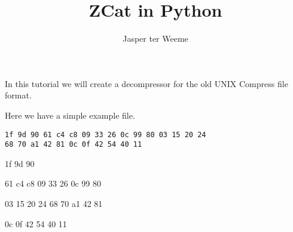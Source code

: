 \documentclass{article}
\title{ZCat in Python}
\author{Jasper ter Weeme}
\begin{document}
\maketitle
In this tutorial we will create a decompressor for the
old UNIX Compress file format.

Here we have a simple example file.
\begin{verbatim}
1f 9d 90 61 c4 c8 09 33 26 0c 99 80 03 15 20 24
68 70 a1 42 81 0c 0f 42 54 40 11
\end{verbatim}

1f
9d
90

61
c4
c8
09
33
26
0c
99
80

03
15
20
24
68
70
a1
42
81

0c
0f
42
54
40
11
\end{document}
